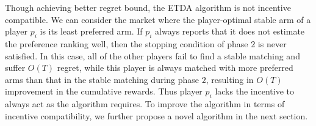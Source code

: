 Though achieving better regret bound, the ETDA algorithm is not incentive compatible. We can consider the market where the player-optimal stable arm of a player $p_i$ is its least preferred arm. 
If $p_i$ always reports that it does not estimate the preference ranking well, then the stopping condition of phase $2$ is never satisfied. In this case,  all of the other players fail to find a stable matching and suffer $O(T)$ regret, while this player is always matched with more preferred arms than that in the stable matching during phase $2$, resulting in $O(T)$ improvement in the cumulative rewards.  Thus player $p_i$ lacks the incentive to always act as the algorithm requires. 
To improve the algorithm in terms of incentive compatibility, we further propose a novel algorithm in the next section. 
